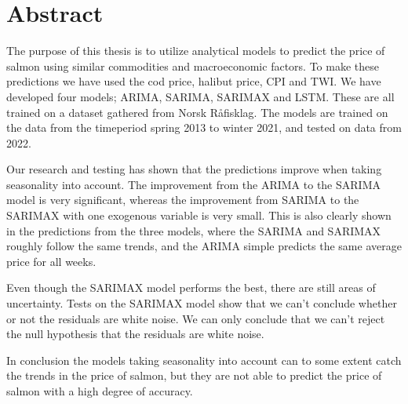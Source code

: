 \section*{Abstract}
The purpose of this thesis is to utilize analytical models to predict the price of salmon using similar commodities and macroeconomic factors. To make these predictions we have used the cod price, halibut price, CPI and TWI. We have developed four models; ARIMA, SARIMA, SARIMAX and LSTM. These are all trained on a dataset gathered from Norsk Råfisklag. The models are trained on the data from the timeperiod spring 2013 to winter 2021, and tested on data from 2022. 

Our research and testing has shown that the predictions improve when taking seasonality into account. The improvement from the ARIMA to the SARIMA model is very significant, whereas the improvement from SARIMA to the SARIMAX with one exogenous variable is very small. This is also clearly shown in the predictions from the three models, where the SARIMA and SARIMAX roughly follow the same trends, and the ARIMA simple predicts the same average price for all weeks. 

Even though the SARIMAX model performs the best, there are still areas of uncertainty. Tests on the SARIMAX model show that we can't conclude whether or not the residuals are white noise. We can only conclude that we can't reject the null hypothesis that the residuals are white noise.  

In conclusion the models taking seasonality into account can to some extent catch the trends in the price of salmon, but they are not able to predict the price of salmon with a high degree of accuracy. 